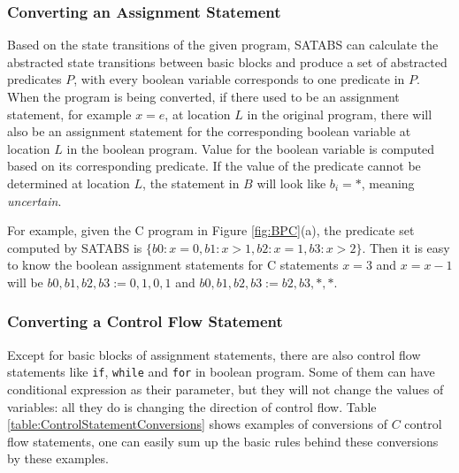 \subsubsection{Converting an Assignment Statement}
\label{section:ConvertingAnAssignmentStatement}
Based on the state transitions of the given program, SATABS can calculate the abstracted state transitions between basic blocks and produce a set of abstracted predicates $P$, with every boolean variable corresponds to one predicate in $P$.
When the program is being converted, if there used to be an assignment statement, for example $x = e$, at location $L$ in the original program, there will also be an assignment statement for the corresponding boolean variable at location $L$ in the boolean program\cite{MLS:STEPaBP}.
Value for the boolean variable is computed based on its corresponding predicate.
If the value of the predicate cannot be determined at location $L$, the statement in $B$ will look like $b_{i} = *$, meaning {\it uncertain}.

For example, given the C program in Figure \ref{fig:BPC}(a), the predicate set computed by SATABS is $\{b0 : x = 0, b1 : x > 1, b2 : x = 1, b3 : x > 2\}$. Then it is easy to know the boolean assignment statements for C statements $x = 3$ and $x = x - 1$ will be $b0,b1,b2,b3 := 0,1,0,1$ and $b0,b1,b2,b3 := b2,b3,*,*$.

\subsubsection{Converting a Control Flow Statement}
\label{section:ConvertingAControlFlowStatement}
Except for basic blocks of assignment statements, there are also control flow statements like \lstinline|if|, \lstinline|while| and \lstinline|for| in boolean program.
Some of them can have conditional expression as their parameter, but they will not change the values of variables: all they do is changing the direction of control flow.
Table \ref{table:ControlStatementConversions} shows examples of conversions of $C$ control flow statements, one can easily sum up the basic rules behind these conversions by these examples.

